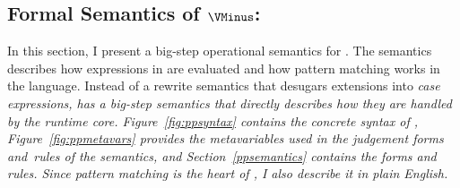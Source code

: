 \documentclass[manuscript,screen,review, 12pt, nonacm]{acmart}
\begin{document}


\subsection{Formal Semantics of $\VMinus$:}

In this section, I present a big-step operational semantics for \PPlus. The
semantics describes how expressions in \PPlus are evaluated and how pattern
matching works in the language. Instead of a rewrite semantics that desugars
extensions into \it{case} expressions, \PPlus has a big-step semantics that
directly describes how they are handled by the runtime core.
Figure~\ref{fig:ppsyntax} contains the concrete syntax of \PPlus,
Figure~\ref{fig:ppmetavars} provides the metavariables used in the judgement
forms and~rules of the semantics, and Section~\ref{ppsemantics} contains the
forms and rules. Since pattern matching is the heart of \PPlus, I also
describe it in plain English.
\end{document}
